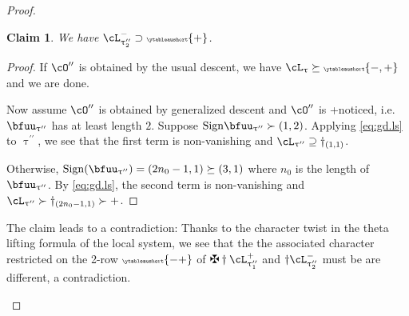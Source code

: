 \documentclass[12pt,a4paper]{amsart}
\numberwithin{equation}{section}
\newtheorem{claim}[thm]{Claim}
\theoremstyle{remark}
\def\ssign{\mathrm{Sign}}
\let\ytb=\ytableaushort
\newcommand{\tytb}[1]{{\tiny\ytb{#1}}}
\def\cOpp{\cO^{\prime\prime}}
\def\pcL{\cL^+}
\def\ncL{\cL^-}
\def\uptaupp{\uptau^{\prime\prime}}
\begin{document}
\begin{proof}
\begin{enumPF}
\begin{enumPF}
    \begin{claim}\label{c:d+}
      We have $\ncL_{\uptaupp_{2}}\supset \tytb{+}$.
    \end{claim}
    \begin{proof}
      If $\cOpp$ is obtained by the usual descent, we have
      $\cL_{\uptau}\succeq \tytb{-,+}$ and we are done.

      Now assume $\cOpp$ is obtained by generalized descent and $\cOpp$ is
      +noticed, i.e. $\bfuu_{\uptaupp}$ has at least length $2$.
      Suppose $\ssign{\bfuu_{\uptaupp}}\succ (1,2)$. Applying \eqref{eq:gd.ls} to $\uptaupp$,
      we see that the first term is non-vanishing and
      $\cL_{\uptaupp}\supseteq \dagger_{(1,1)}$.

      Otherwise, $\ssign( \bfuu_{\uptaupp} ) = (2n_{0}-1,1)\succeq (3,1)$ where $n_{0}$ is the
      length of $\bfuu_{\uptaupp}$. By \eqref{eq:gd.ls}, the second term is
      non-vanishing and $\cL_{\uptaupp}\succ \dagger_{(2n_{0}-1,1)}\succ +$.
    \end{proof}

    The claim leads to a contradiction: Thanks to the character twist in the theta
    lifting formula of the local system, we see that the the associated
    character restricted on the 2-row $\tytb{-+}$ of $\maltese \dagger \pcL_{\uptaupp_{1}}$ and
    $\dagger \ncL_{\uptaupp_{2}}$ must be are different, a contradiction.


\end{enumPF}
\end{enumPF}
\end{proof}
\end{document}
